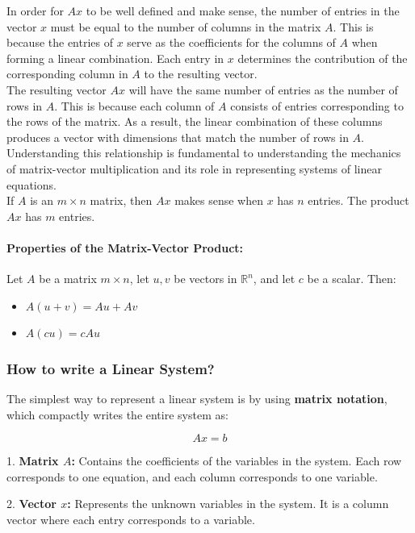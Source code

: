 \documentclass[a4paper,12pt]{article}
\begin{document}
In order for \( Ax \) to be well defined and make sense, the number of entries in the vector \( x \) must be equal to the number of columns in the matrix \( A \). This is because the entries of \( x \) serve as the coefficients for the columns of \( A \) when forming a linear combination. Each entry in \( x \) determines the contribution of the corresponding column in \( A \) to the resulting vector.\\

The resulting vector \( Ax \) will have the same number of entries as the number of rows in \( A \). This is because each column of \( A \) consists of entries corresponding to the rows of the matrix. As a result, the linear combination of these columns produces a vector with dimensions that match the number of rows in \( A \). Understanding this relationship is fundamental to understanding the mechanics of matrix-vector multiplication and its role in representing systems of linear equations.\\

If \(A\) is an \(m \times n\)  matrix, then \(Ax\) makes sense when \(x\) has \(n\) entries. The product \(Ax\) has \(m\) entries.

\paragraph{Properties of the Matrix-Vector Product:}\label{matrix-vector-product} Let \(A\) be a matrix \(m \times n\), let \(u, v\) be vectors in \(\mathbb{R}^n\), and let \(c\) be a scalar. Then:
\begin{itemize}
    \item \(A(u+v) = Au + Av\)
    \item \(A(cu) = cAu\)
\end{itemize}



\subsubsection{How to write a Linear System?}The simplest way to represent a linear system is by using \textbf{matrix notation}, which compactly writes the entire system as:

\[
Ax = b
\]

1. \textbf{Matrix \( A \):} Contains the coefficients of the variables in the system. Each row corresponds to one equation, and each column corresponds to one variable.

2. \textbf{Vector \( x \):} Represents the unknown variables in the system. It is a column vector where each entry corresponds to a variable.
\end{document}
